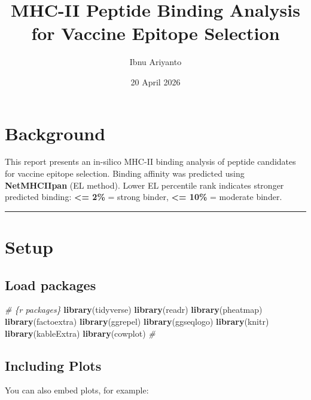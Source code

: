 \documentclass[
]{article}
\title{MHC-II Peptide Binding Analysis for Vaccine Epitope Selection}
\author{Ibnu Ariyanto}
\date{20 April 2026}
\newenvironment{Shaded}{\begin{snugshade}}{\end{snugshade}}
\newcommand{\CommentTok}[1]{\textcolor[rgb]{0.56,0.35,0.01}{\textit{#1}}}
\newcommand{\FunctionTok}[1]{\textcolor[rgb]{0.13,0.29,0.53}{\textbf{#1}}}
\newcommand{\NormalTok}[1]{#1}
\begin{document}
\maketitle

{
\setcounter{tocdepth}{3}
\tableofcontents
}
\section{Background}\label{background}

This report presents an in-silico MHC-II binding analysis of peptide
candidates for vaccine epitope selection. Binding affinity was predicted
using \textbf{NetMHCIIpan} (EL method). Lower EL percentile rank
indicates stronger predicted binding: \textbf{\textless= 2\%} = strong
binder, \textbf{\textless= 10\%} = moderate binder.

\begin{center}\rule{0.5\linewidth}{0.5pt}\end{center}

\section{Setup}\label{setup}

\subsection{Load packages}\label{load-packages}

\begin{Shaded}
\begin{Highlighting}[]
\CommentTok{\# \textasciigrave{}\textasciigrave{}\textasciigrave{}\{r packages\}}
\FunctionTok{library}\NormalTok{(tidyverse)}
\FunctionTok{library}\NormalTok{(readr)}
\FunctionTok{library}\NormalTok{(pheatmap)}
\FunctionTok{library}\NormalTok{(factoextra)}
\FunctionTok{library}\NormalTok{(ggrepel)}
\FunctionTok{library}\NormalTok{(ggseqlogo)}
\FunctionTok{library}\NormalTok{(knitr)}
\FunctionTok{library}\NormalTok{(kableExtra)}
\FunctionTok{library}\NormalTok{(cowplot)}
\CommentTok{\# \textasciigrave{}\textasciigrave{}\textasciigrave{}}
\end{Highlighting}
\end{Shaded}

\subsection{Including Plots}\label{including-plots}

You can also embed plots, for example:
\end{document}
